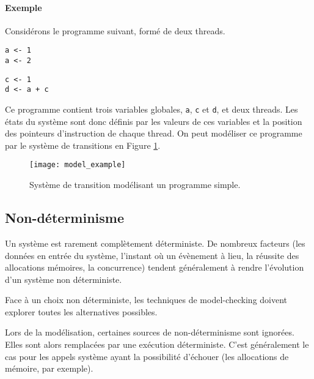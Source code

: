 \paragraph{Exemple}

Considérons le programme suivant, formé de deux threads.

\noindent\begin{minipage}{.45\textwidth}
\begin{lstlisting}[caption=Thread 1, frame=single]
a <- 1
a <- 2
\end{lstlisting}
\end{minipage}\hfill
\begin{minipage}{.45\textwidth}
\begin{lstlisting}[caption=Thread 2,frame=tlrb]
c <- 1
d <- a + c
\end{lstlisting}
\end{minipage}

Ce programme contient trois variables globales, \texttt{a}, \texttt{c} et
\texttt{d}, et deux threads. Les états du système sont donc définis par les
valeurs de ces variables et la position des pointeurs d'instruction de chaque
thread. On peut modéliser ce programme par le système de transitions en Figure
\ref{fig:model_example}.

\begin{figure}
\begin{center}
\texttt{[image: model\_example]}
\end{center}
\caption{Système de transition modélisant un programme simple.}
\label{fig:model_example}
\end{figure}

\subsection{Non-déterminisme}

Un système est rarement complètement déterministe. De nombreux facteurs (les
données en entrée du système, l'instant où un évènement à lieu, la réussite des
allocations mémoires, la concurrence) tendent généralement à rendre l'évolution
d'un système non déterministe.

Face à un choix non déterministe, les techniques de model-checking doivent
explorer toutes les alternatives possibles.

Lors de la modélisation, certaines sources de non-déterminisme sont ignorées.
Elles sont alors remplacées par une exécution déterministe.
C'est généralement le cas pour les appels système ayant la possibilité
d'échouer (les allocations de mémoire, par exemple).

